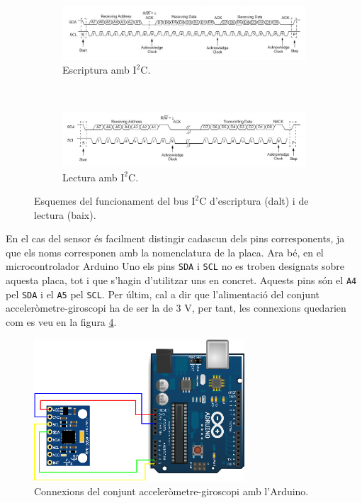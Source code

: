 \documentclass[12pt,a4paper,final,twoside]{article}
\begin{document}
\begin{figure}[tb]

\centering
\begin{subfigure}[b]{\textwidth}
\centering
\includegraphics[width=\textwidth]{Imatges/i2c-write-transmission.png}
\caption{Escriptura amb $\mathrm{I^2C}$.}
\label{fig:i2c-write-transmission}
\end{subfigure}
~
\begin{subfigure}[b]{\textwidth}
\centering
\includegraphics[width=\textwidth]{Imatges/i2c-read-transmission.png}
\caption{Lectura amb $\mathrm{I^2C}$.}
\label{fig:i2c-read-transmission}
\end{subfigure}
\caption{Esquemes del funcionament del bus $\mathrm{I^2C}$ d'escriptura (dalt) i de lectura (baix).}
\end{figure}

En el cas del sensor és facilment distingir cadascun dels pins corresponents, ja que els noms corresponen amb la nomenclatura de la placa. Ara bé, en el microcontrolador Arduino Uno els pins \texttt{SDA} i \texttt{SCL} no es troben designats sobre aquesta placa, tot i que s'hagin d'utilitzar uns en concret. Aquests pins són el \texttt{A4} pel \texttt{SDA} i el \texttt{A5} pel \texttt{SCL}. Per últim, cal a dir que l'alimentació del conjunt acceleròmetre-giroscopi ha de ser la de 3 V, per tant, les connexions quedarien com es veu en la figura \ref{fig:connexions-sensor-Arduino}. 


\begin{figure}[bt]
\centering
\includegraphics[width=0.7\textwidth]{Imatges/connexions-sensor-Arduino.eps}
\caption{Connexions del conjunt acceleròmetre-giroscopi amb l'Arduino.}
\label{fig:connexions-sensor-Arduino}
\end{figure}
\end{document}
